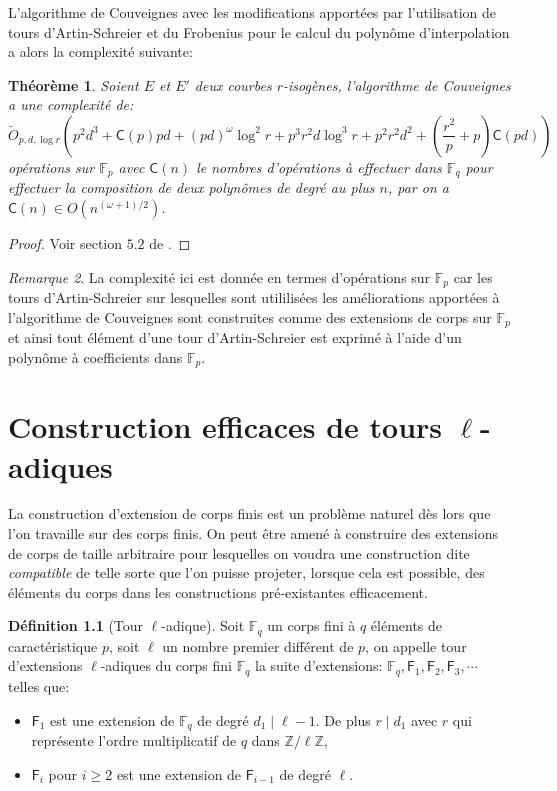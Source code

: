 \documentclass[10pt,a4paper]{book}
\theoremstyle{plain}
\newtheorem{thm}{Théorème}[chapter]
\theoremstyle{definition}
\theoremstyle{definition}
\theoremstyle{definition}
\theoremstyle{definition}
\newtheorem{defi}[thm]{Définition}
\theoremstyle{remark}
\newtheorem{rem}[thm]{Remarque}
\theoremstyle{remark}
\theoremstyle{definition}
\begin{document}
L'algorithme de Couveignes avec les modifications apportées par l'utilisation de tours d'Artin-Schreier et du Frobenius pour le calcul du polynôme d'interpolation a alors la complexité suivante:

\begin{thm} 
Soient $E$ et $E'$ deux courbes $r$-isogènes, l'algorithme de Couveignes a une complexité de:
\[
\tilde{O}_{p,d,\log r}(p^2d^3+\mathsf{C}(p)pd+(pd)^{\omega}\log^2 r + p^3 r^2 d \log^3 r + p^2r^2d^2+(\frac{r^2}{p}+p)\mathsf{C}(pd))
\]
opérations sur $\mathbb{F}_p$ avec $\mathsf{C}(n)$ le nombres d'opérations à effectuer dans $\mathbb{F}_q$ pour effectuer la composition de deux polynômes de degré au plus $n$, par \cite{BrentKung78} on a $\mathsf{C}(n) \in O(n^{(\omega+1)/2})$.
\end{thm}

\begin{proof}
Voir section $5.2$ de \cite{DeFeo11}.
\end{proof}

\begin{rem}
La complexité ici est donnée en termes d'opérations sur $\mathbb{F}_p$ car les 
tours d'Artin-Schreier sur lesquelles sont utililisées les améliorations 
apportées à l'algorithme de Couveignes sont construites comme des extensions de
corps sur $\mathbb{F}_p$ et ainsi tout élément d'une tour d'Artin-Schreier est
exprimé à l'aide d'un polynôme à coefficients dans $\mathbb{F}_p$.
\end{rem}

\chapter{Construction efficaces de tours $\ell$-adiques}
\label{cha:tour}
La construction d'extension de corps finis est un problème naturel dès lors que l'on travaille sur des corps finis. On peut être amené à construire des extensions de corps de taille arbitraire pour lesquelles on voudra une construction dite \textit{compatible} de telle sorte que l'on puisse projeter, lorsque cela est possible, des éléments du corps dans les constructions pré-existantes efficacement.

\begin{defi}[Tour \textit{$\ell$}-adique]
\label{def:tour-ell}
Soit $\mathbb{F}_q$ un corps fini à $q$ éléments de caractéristique $p$, soit $\ell$ un nombre premier différent de $p$, on appelle tour d'extensions $\ell$-adiques du corps fini $\mathbb{F}_q$ la suite d'extensions: $\mathbb{F}_q, \mathsf{F}_{1}, \mathsf{F}_{2}, \mathsf{F}_{3}, \cdots$ telles que:
\begin{itemize}
\item $\mathsf{F}_{1}$ est une extension de $\mathbb{F}_q$ de degré $d_1 \mid \ell-1$. De plus $r \mid d_1$ avec $r$ qui représente l'ordre multiplicatif de $q$ dans $\mathbb{Z}/\ell \mathbb{Z}$,
\item $\mathsf{F}_{i}$ pour $i \geqslant 2$ est une extension de $\mathsf{F}_{i-1}$ de degré $\ell$.
\end{itemize}
\end{defi}
\end{document}
